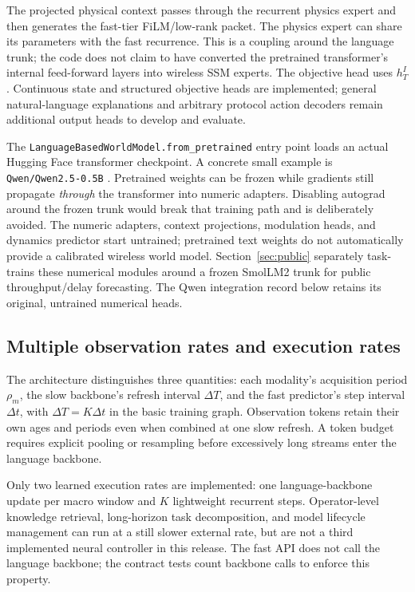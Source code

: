 The projected physical context passes through the recurrent physics expert and
then generates the fast-tier FiLM/low-rank packet. The physics expert can share
its parameters with the fast recurrence. This is a coupling around the language
trunk; the code does not claim to have converted the pretrained transformer's
internal feed-forward layers into wireless SSM experts. The objective head
uses $h_T^I$. Continuous state and structured objective heads are implemented;
general natural-language explanations and arbitrary protocol action decoders
remain additional output heads to develop and evaluate.

The \texttt{LanguageBasedWorldModel.from\_pretrained} entry point loads an actual
Hugging Face transformer checkpoint. A concrete small example is
\texttt{Qwen/Qwen2.5-0.5B} \cite{qwen2024}. Pretrained weights can be frozen while
gradients still propagate \emph{through} the transformer into numeric adapters.
Disabling autograd around the frozen trunk would break that training path and
is deliberately avoided. The numeric adapters, context projections, modulation
heads, and dynamics predictor start untrained; pretrained text weights do not
automatically provide a calibrated wireless world model. Section~\ref{sec:public}
separately task-trains these numerical modules around a frozen SmolLM2 trunk
for public throughput/delay forecasting. The Qwen integration record below
retains its original, untrained numerical heads.

\subsection{Multiple observation rates and execution rates}
The architecture distinguishes three quantities: each modality's acquisition
period $\rho_m$, the slow backbone's refresh interval $\Delta T$, and the fast
predictor's step interval $\Delta t$, with $\Delta T=K\Delta t$ in the basic
training graph. Observation tokens retain their own ages and periods even when
combined at one slow refresh. A token budget requires explicit pooling or
resampling before excessively long streams enter the language backbone.

Only two learned execution rates are implemented: one language-backbone update
per macro window and $K$ lightweight recurrent steps. Operator-level knowledge
retrieval, long-horizon task decomposition, and model lifecycle management can
run at a still slower external rate, but are not a third implemented neural
controller in this release. The fast API does not call the language backbone;
the contract tests count backbone calls to enforce this property.

